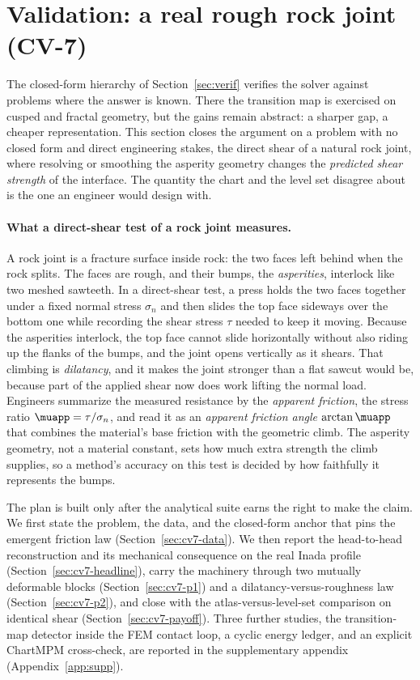 \section{Validation: a real rough rock joint (CV-7)}\label{sec:cv7}

The closed-form hierarchy of Section~\ref{sec:verif} verifies the solver against problems where the answer is known. There the transition map is exercised on cusped and fractal geometry, but the gains remain abstract: a sharper gap, a cheaper representation. This section closes the argument on a problem with no closed form and direct engineering stakes, the direct shear of a natural rock joint, where resolving or smoothing the asperity geometry changes the \emph{predicted shear strength} of the interface. The quantity the chart and the level set disagree about is the one an engineer would design with.

\paragraph{What a direct-shear test of a rock joint measures.} A rock joint is a fracture surface inside rock: the two faces left behind when the rock splits. The faces are rough, and their bumps, the \emph{asperities}, interlock like two meshed sawteeth. In a direct-shear test, a press holds the two faces together under a fixed normal stress $\sigma_n$ and then slides the top face sideways over the bottom one while recording the shear stress $\tau$ needed to keep it moving. Because the asperities interlock, the top face cannot slide horizontally without also riding up the flanks of the bumps, and the joint opens vertically as it shears. That climbing is \emph{dilatancy}, and it makes the joint stronger than a flat sawcut would be, because part of the applied shear now does work lifting the normal load. Engineers summarize the measured resistance by the \emph{apparent friction}, the stress ratio $\muapp=\tau/\sigma_n$, and read it as an \emph{apparent friction angle} $\arctan\muapp$ that combines the material's base friction with the geometric climb. The asperity geometry, not a material constant, sets how much extra strength the climb supplies, so a method's accuracy on this test is decided by how faithfully it represents the bumps.

The plan is built only after the analytical suite earns the right to make the claim. We first state the problem, the data, and the closed-form anchor that pins the emergent friction law (Section~\ref{sec:cv7-data}). We then report the head-to-head reconstruction and its mechanical consequence on the real Inada profile (Section~\ref{sec:cv7-headline}), carry the machinery through two mutually deformable blocks (Section~\ref{sec:cv7-p1}) and a dilatancy-versus-roughness law (Section~\ref{sec:cv7-p2}), and close with the atlas-versus-level-set comparison on identical shear (Section~\ref{sec:cv7-payoff}). Three further studies, the transition-map detector inside the FEM contact loop, a cyclic energy ledger, and an explicit ChartMPM cross-check, are reported in the supplementary appendix (Appendix~\ref{app:supp}).

